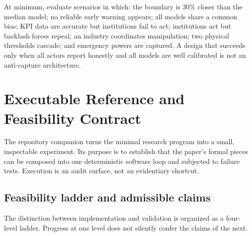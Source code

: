 \documentclass[11pt,a4paper]{article}
\numberwithin{equation}{section}
\theoremstyle{definition}
\theoremstyle{plain}
\theoremstyle{remark}
\begin{document}
At minimum, evaluate scenarios in which: the boundary is 30\% closer than the median model; no reliable early warning appears; all models share a common bias; KPI data are accurate but institutions fail to act; institutions act but backlash forces repeal; an industry coordinates manipulation; two physical thresholds cascade; and emergency powers are captured. A design that succeeds only when all actors report honestly and all models are well calibrated is not an anti-capture architecture.

\section{Executable Reference and Feasibility Contract}

The repository companion turns the minimal research program into a small, inspectable experiment. Its purpose is to establish that the paper's formal pieces can be composed into one deterministic software loop and subjected to failure tests. Execution is an audit surface, not an evidentiary shortcut.

\subsection{Feasibility ladder and admissible claims}

The distinction between implementation and validation is organized as a four-level ladder. Progress at one level does not silently confer the claims of the next.
\end{document}
